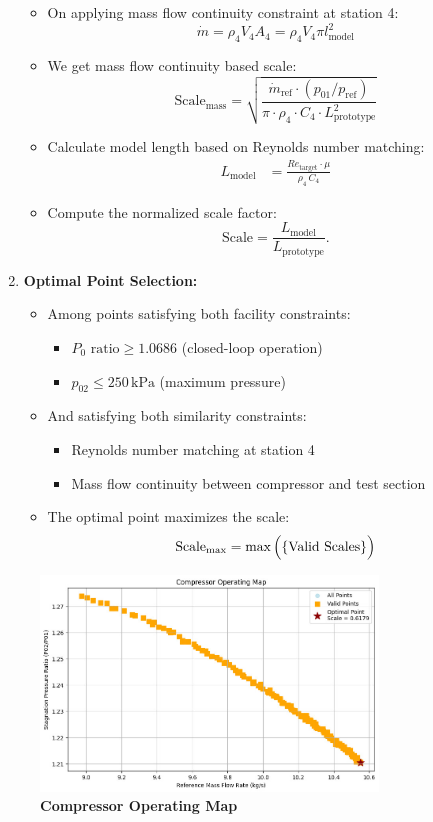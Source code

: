 \documentclass[12pt,a4paper]{article}
\begin{document}
\begin{enumerate}
\begin{itemize}
		\item On applying mass flow continuity constraint at station 4:
		$$
		\dot{m} = \rho_4 V_4 A_4 = \rho_4 V_4 \pi l^2_{\text{model}}
		$$
		\item We get mass flow continuity based scale:
		$$
		\text{Scale}_{\text{mass}} = \sqrt{\frac{\dot{m}_{\text{ref}} \cdot (p_{01}/p_{\text{ref}})}{\pi \cdot \rho_4 \cdot C_4 \cdot L_{\text{prototype}}^2}}
		$$
		
		\item Calculate model length based on Reynolds number matching:
		$$
		\begin{aligned}
			L_{\text{model}} &= \frac{Re_{\text{target}} \cdot \mu}{\rho_4\, C_4}
		\end{aligned}
		$$
		
		\item Compute the normalized scale factor:
		$$
		\text{Scale} = \frac{L_{\text{model}}}{L_{\text{prototype}}}.
		$$
	\end{itemize}
	\item \textbf{Optimal Point Selection:}
	\begin{itemize}
		\item Among points satisfying both facility constraints:
		\begin{itemize}
			\item $P_0\text{ ratio} \geq 1.0686$ (closed-loop operation)
			\item $p_{02} \leq 250\,\text{kPa}$ (maximum pressure)
		\end{itemize}
		\item And satisfying both similarity constraints:
		\begin{itemize}
			\item Reynolds number matching at station 4
			\item Mass flow continuity between compressor and test section
		\end{itemize}
		\item The optimal point maximizes the scale:
		$$\text{Scale}_{\text{max}} = \text{max }\!\Bigl(\{\text{Valid Scales}\}\Bigr)$$
	\end{itemize}
		
\end{enumerate}

	\vspace*{-10pt}
	\begin{figure}[h]
		\centering
		\includegraphics[width=0.8\textwidth]{Figure_1.jpg}
		\caption{\textbf{Compressor Operating Map}}
		\label{fig:compressor_map}
	\end{figure}
	
\end{document}
